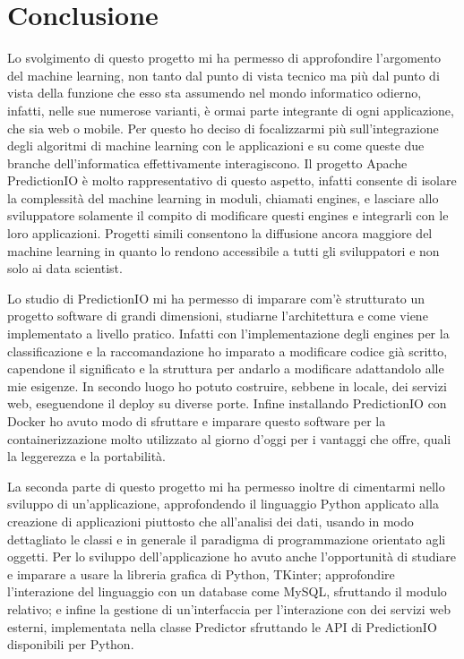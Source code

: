 \chapter{Conclusione}\label{c:conclusione}

Lo svolgimento di questo progetto mi ha permesso di approfondire l'argomento del machine learning, non tanto dal punto di vista tecnico ma più dal punto di vista della funzione che esso sta assumendo nel mondo informatico odierno, infatti, nelle sue numerose varianti, è ormai parte integrante di ogni applicazione, che sia web o mobile. Per questo ho deciso di focalizzarmi più sull'integrazione degli algoritmi di machine learning con le applicazioni e su come queste due branche dell'informatica effettivamente interagiscono. Il progetto Apache PredictionIO è molto rappresentativo di questo aspetto, infatti consente di isolare la complessità del machine learning in moduli, chiamati engines, e lasciare allo sviluppatore solamente il compito di modificare questi engines e integrarli con le loro applicazioni.  Progetti simili consentono la diffusione ancora maggiore del machine learning in quanto lo rendono accessibile a tutti gli sviluppatori e non solo ai data scientist.

Lo studio di PredictionIO mi ha permesso di imparare com'è strutturato un progetto software di grandi dimensioni, studiarne l'architettura e come viene implementato a livello pratico. Infatti con l'implementazione degli engines per la classificazione e la raccomandazione ho imparato a modificare codice già scritto, capendone il significato e la struttura per andarlo a modificare adattandolo alle mie esigenze. In secondo luogo ho potuto costruire, sebbene in  locale, dei servizi web, eseguendone il deploy su diverse porte. Infine installando PredictionIO con Docker ho avuto modo di sfruttare e imparare questo software per la containerizzazione molto utilizzato al giorno d'oggi per i vantaggi che offre, quali la leggerezza e la portabilità.

La seconda parte di questo progetto mi ha permesso inoltre di cimentarmi nello sviluppo di un'applicazione, approfondendo il linguaggio Python applicato alla creazione di applicazioni piuttosto che all'analisi dei dati, usando in modo dettagliato le classi e in generale il paradigma di programmazione orientato agli oggetti. Per lo sviluppo dell'applicazione ho avuto anche l'opportunità di studiare e imparare a usare la libreria grafica di Python, TKinter; approfondire l'interazione del linguaggio con un database come MySQL, sfruttando il modulo relativo; e infine la gestione di un'interfaccia per l'interazione con dei servizi web esterni, implementata nella classe Predictor sfruttando le API di PredictionIO disponibili per Python.